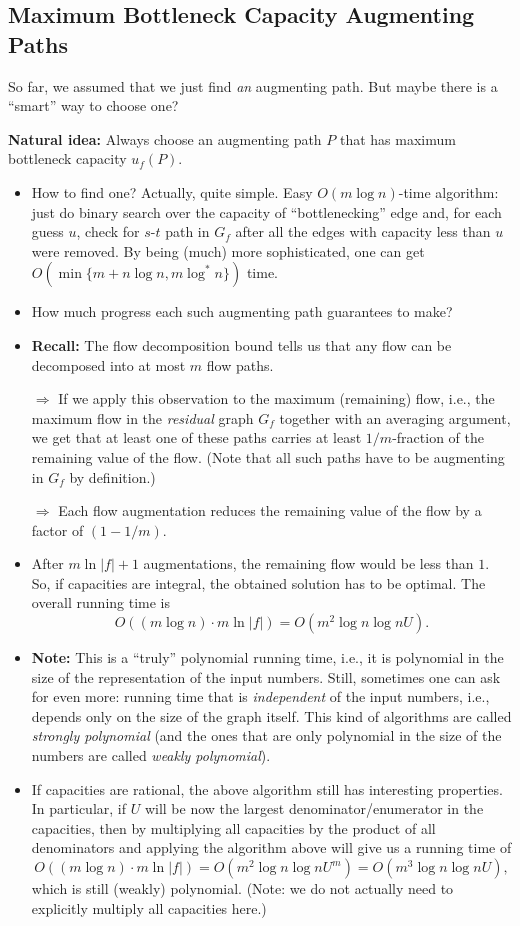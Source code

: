 \documentclass{article}
\begin{document}
\subsection{Maximum Bottleneck Capacity Augmenting Paths}

So far, we assumed that we just find {\em an} augmenting path. But maybe there is a ``smart'' way to choose one?

\textbf{Natural idea:} Always choose an augmenting path $P$ that has maximum bottleneck capacity $u_f(P)$.

\begin{itemize}
\item How to find one? Actually, quite simple.  Easy $O(m\log n)$-time algorithm: just do binary search over the capacity of ``bottlenecking'' edge and, for each guess $u$, check for $s$-$t$ path in $G_f$ after all the edges with capacity less than $u$ were removed. By being (much) more sophisticated, one can get $O(\min\{ m+n \log n, m \log^*n\})$ time. 
\item How much progress each such augmenting path guarantees to make?
\item \textbf{Recall:} The flow decomposition bound tells us that any flow can be decomposed into at most $m$ flow paths. 

$\Rightarrow$ If we apply this observation to the maximum (remaining) flow, i.e., the maximum flow in the {\em residual} graph $G_f$ together with an averaging argument,  we get that at least one of these paths carries at least $1/m$-fraction of the remaining value of the flow. (Note that all such paths have to be augmenting in $G_f$ by definition.)

$\Rightarrow$ Each flow augmentation reduces the remaining value of the flow by a factor of $(1-1/m)$. 
\item After $m\ln |f| +1$ augmentations, the remaining flow would be less than $1$. So, if capacities are integral, the obtained solution has to be optimal. The overall running time is 
\[
O((m\log n)\cdot m \ln |f|)=O(m^2 \log n \log nU).
\]
\item \textbf{Note:} This is a ``truly'' polynomial running time, i.e., it is polynomial in the size of the representation of the input numbers. Still, sometimes one can ask for even more: running time that is {\em independent} of the input numbers, i.e., depends only on the size of the graph itself. This kind of algorithms are called {\em strongly polynomial} (and the ones that are only polynomial in the size of the numbers are called {\em weakly polynomial}).
\item If capacities are rational, the above algorithm still has interesting properties. In particular, if $U$ will be now the largest denominator/enumerator in the capacities, then by multiplying all capacities by the product of all denominators and applying the algorithm above will give us a running time of
\[
O((m\log n)\cdot m \ln |f|)=O(m^2 \log n \log nU^m)=O(m^3 \log n \log nU),
\]
which is still (weakly) polynomial. (Note: we do not actually need to explicitly multiply all capacities here.)
\end{itemize} 
\end{document}
